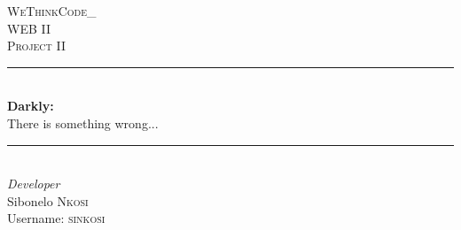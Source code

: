 \begin{titlepage} %
	\newcommand{\HRule}{\rule{\linewidth}{0.5mm}} %
	
	\center %
	
	
	\textsc{\LARGE WeThinkCode\_}\\[1.5cm] %
	
	\textsc{\Large WEB II}\\[0.5cm] %
	
	\textsc{\large Project II}\\[0.5cm] %
	
	
	\HRule\\[0.4cm]
	
	{\huge\bfseries Darkly: }\\{\large There is something wrong...}\\[0.4cm] %
	
	\HRule\\[1.5cm]
	
	
	
	{\large\textit{Developer}}\\
	Sibonelo \textsc{Nkosi}\\ %
	Username: \textsc{sinkosi} %


\end{titlepage}
